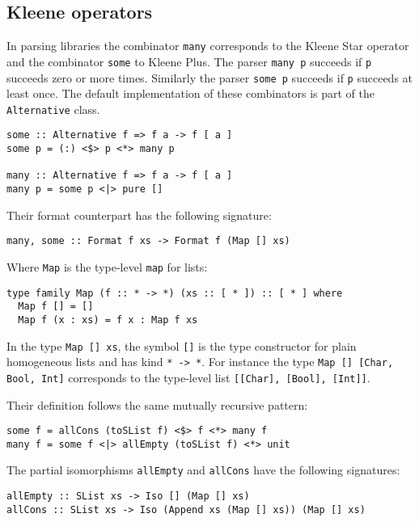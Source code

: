 \documentclass[../Thesis.tex]{subfiles}
\begin{document}
\subsection{Kleene operators}
\label{subsec:Many}
In parsing libraries the combinator \texttt{many} corresponds to the Kleene Star operator and the combinator \texttt{some} to Kleene Plus. The parser \texttt{many p} succeeds if \texttt{p} succeeds zero or more times. Similarly the parser \texttt{some p} succeeds if \texttt{p} succeeds at least once.
The default implementation of these combinators is part of the \texttt{Alternative} class. 
\begin{verbatim}
some :: Alternative f => f a -> f [ a ]
some p = (:) <$> p <*> many p

many :: Alternative f => f a -> f [ a ]
many p = some p <|> pure []
\end{verbatim}

Their format counterpart has the following signature:
\begin{verbatim}
many, some :: Format f xs -> Format f (Map [] xs)
\end{verbatim}

Where \texttt{Map} is the type-level \texttt{map} for lists:
\begin{verbatim}
type family Map (f :: * -> *) (xs :: [ * ]) :: [ * ] where
  Map f [] = []
  Map f (x : xs) = f x : Map f xs
\end{verbatim}

In the type \texttt{Map [] xs}, the symbol \texttt{[]} is the type constructor for plain homogeneous lists and has kind \texttt{* -> *}.
For instance the type \texttt{Map [] [Char, Bool, Int]} corresponds to the type-level list \texttt{[[Char], [Bool], [Int]]}.

Their definition follows the same mutually recursive pattern:
\begin{verbatim}
some f = allCons (toSList f) <$> f <*> many f
many f = some f <|> allEmpty (toSList f) <*> unit
\end{verbatim}

The partial isomorphisms \texttt{allEmpty} and \texttt{allCons} have the following signatures:

\begin{verbatim}
allEmpty :: SList xs -> Iso [] (Map [] xs)
allCons :: SList xs -> Iso (Append xs (Map [] xs)) (Map [] xs)
\end{verbatim}

\end{document}
